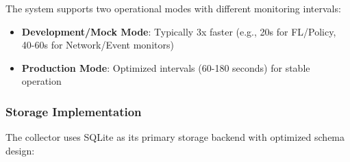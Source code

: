 The system supports two operational modes with different monitoring intervals:

\begin{itemize}
    \item \textbf{Development/Mock Mode}: Typically 3x faster (e.g., 20s for FL/Policy, 40-60s for Network/Event monitors)
    \item \textbf{Production Mode}: Optimized intervals (60-180 seconds) for stable operation
\end{itemize}

\subsubsection{Storage Implementation}

The collector uses SQLite as its primary storage backend with optimized schema design:

